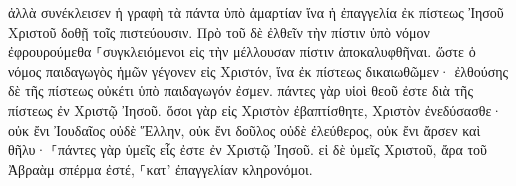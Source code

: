 \documentclass{openreader}
\begin{document}
ἀλλὰ συνέκλεισεν ἡ γραφὴ τὰ πάντα ὑπὸ ἁμαρτίαν ἵνα ἡ ἐπαγγελία ἐκ πίστεως Ἰησοῦ Χριστοῦ δοθῇ τοῖς πιστεύουσιν. 
Πρὸ τοῦ δὲ ἐλθεῖν τὴν πίστιν ὑπὸ νόμον ἐφρουρούμεθα ⸀συγκλειόμενοι εἰς τὴν μέλλουσαν πίστιν ἀποκαλυφθῆναι. 
ὥστε ὁ νόμος παιδαγωγὸς ἡμῶν γέγονεν εἰς Χριστόν, ἵνα ἐκ πίστεως δικαιωθῶμεν· 
ἐλθούσης δὲ τῆς πίστεως οὐκέτι ὑπὸ παιδαγωγόν ἐσμεν. 
πάντες γὰρ υἱοὶ θεοῦ ἐστε διὰ τῆς πίστεως ἐν Χριστῷ Ἰησοῦ. 
ὅσοι γὰρ εἰς Χριστὸν ἐβαπτίσθητε, Χριστὸν ἐνεδύσασθε· 
οὐκ ἔνι Ἰουδαῖος οὐδὲ Ἕλλην, οὐκ ἔνι δοῦλος οὐδὲ ἐλεύθερος, οὐκ ἔνι ἄρσεν καὶ θῆλυ· ⸀πάντες γὰρ ὑμεῖς εἷς ἐστε ἐν Χριστῷ Ἰησοῦ. 
εἰ δὲ ὑμεῖς Χριστοῦ, ἄρα τοῦ Ἀβραὰμ σπέρμα ἐστέ, ⸀κατ’ ἐπαγγελίαν κληρονόμοι. 
\end{document}
